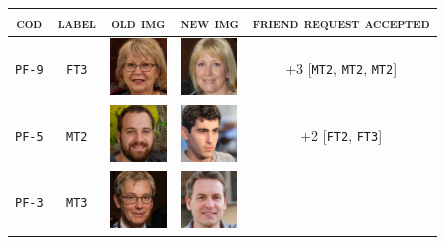 \begin{center}
\begin{tabular}[c]{ |c|c|m{1.5cm}|m{1.5cm}|c| } 
	\hline
	\cellcolor[HTML]{b0d7ff}\textsc{cod} & 
	\cellcolor[HTML]{b0d7ff}\textsc{label} & 
	\multicolumn{1}{|c|}{\cellcolor[HTML]{b0d7ff}\textsc{old img}}&
	\multicolumn{1}{|c|}{\cellcolor[HTML]{b0d7ff}\textsc{new img}}&
	\cellcolor[HTML]{b0d7ff}\textsc{friend request accepted}\\
	\hline 
	\cellcolor[HTML]{b0d7ff}\texttt{PF-9}
	&\cellcolor[HTML]{e6f2ff}\texttt{FT3}
	&\vspace{.15cm}	\includegraphics[height=1.5cm]{immagini/FT3.jpg}
	&\vspace{.15cm}	\includegraphics[height=1.5cm]{immagini/FT3-new.jpg}
	& +3 [\texttt{MT2}, \texttt{MT2}, \texttt{MT2}]\\	 
	\hline 		
	\cellcolor[HTML]{b0d7ff}\texttt{PF-5}
	&\cellcolor[HTML]{e6f2ff}\texttt{MT2}
	&\vspace{.15cm}	\includegraphics[height=1.5cm]{immagini/MT2.jpg}
	&\vspace{.15cm}	\includegraphics[height=1.5cm]{immagini/MT2-new.jpg}
	& +2 [\texttt{FT2}, \texttt{FT3}]\\	 
	\hline
	\cellcolor[HTML]{b0d7ff}\texttt{PF-3}
	&\cellcolor[HTML]{e6f2ff}\texttt{MT3}
	&\vspace{.15cm}	\includegraphics[height=1.5cm]{immagini/MT3.jpg}
	&\vspace{.15cm}	\includegraphics[height=1.5cm]{immagini/MT3-new.jpg}

\end{tabular}
\end{center}
